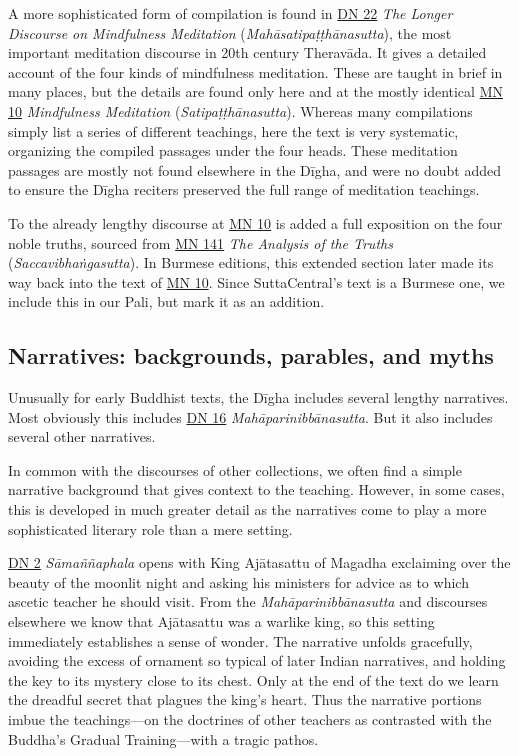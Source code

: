 \documentclass[12pt,openany]{book}%
\begin{document}
A more sophisticated form of compilation is found in \href{https://suttacentral.net/dn22}{DN 22} \textit{The Longer Discourse on Mindfulness Meditation} (\textit{\textsanskrit{Mahāsatipaṭṭhānasutta}}), the most important meditation discourse in 20th century \textsanskrit{Theravāda}. It gives a detailed account of the four kinds of mindfulness meditation. These are taught in brief in many places, but the details are found only here and at the mostly identical \href{https://suttacentral.net/mn10}{MN 10} \textit{Mindfulness Meditation} (\textit{\textsanskrit{Satipaṭṭhānasutta}}). Whereas many compilations simply list a series of different teachings, here the text is very systematic, organizing the compiled passages under the four heads. These meditation passages are mostly not found elsewhere in the \textsanskrit{Dīgha}, and were no doubt added to ensure the \textsanskrit{Dīgha} reciters preserved the full range of meditation teachings.

To the already lengthy discourse at \href{https://suttacentral.net/mn10}{MN 10} is added a full exposition on the four noble truths, sourced from \href{https://suttacentral.net/mn141}{MN 141} \textit{The Analysis of the Truths} (\textit{\textsanskrit{Saccavibhaṅgasutta}}). In Burmese editions, this extended section later made its way back into the text of \href{https://suttacentral.net/mn10}{MN 10}. Since SuttaCentral’s text is a Burmese one, we include this in our Pali, but mark it as an addition.

\subsection*{Narratives: backgrounds, parables, and myths}

Unusually for early Buddhist texts, the \textsanskrit{Dīgha} includes several lengthy narratives. Most obviously this includes \href{https://suttacentral.net/dn16}{DN 16} \textit{\textsanskrit{Mahāparinibbānasutta}}. But it also includes several other narratives.

In common with the discourses of other collections, we often find a simple narrative background that gives context to the teaching. However, in some cases, this is developed in much greater detail as the narratives come to play a more sophisticated literary role than a mere setting.

\href{https://suttacentral.net/dn2}{DN 2} \textit{\textsanskrit{Sāmaññaphala}} opens with King \textsanskrit{Ajātasattu} of Magadha exclaiming over the beauty of the moonlit night and asking his ministers for advice as to which ascetic teacher he should visit. From the \textit{\textsanskrit{Mahāparinibbānasutta}} and discourses elsewhere we know that \textsanskrit{Ajātasattu} was a warlike king, so this setting immediately establishes a sense of wonder. The narrative unfolds gracefully, avoiding the excess of ornament so typical of later Indian narratives, and holding the key to its mystery close to its chest. Only at the end of the text do we learn the dreadful secret that plagues the king’s heart. Thus the narrative portions imbue the teachings—on the doctrines of other teachers as contrasted with the Buddha’s Gradual Training—with a tragic pathos.
\end{document}
